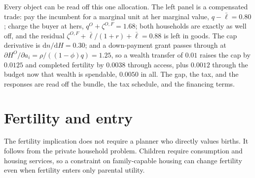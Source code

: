 \documentclass[11pt]{article}
\newcommand{\dd}{\mathrm d}
\newcommand{\1}{\mathbf 1}
\begin{document}
Every object can be read off this one allocation. The left panel is a compensated trade: pay the incumbent for a marginal unit at her marginal value, $q-\bar\ell=0.80$; charge the buyer at hers, $q^O+\zeta^{O,F}=1.68$; both households are exactly as well off, and the residual $\zeta^{O,F}+\bar\ell/(1+r)+\bar\ell=0.88$ is left in goods. The cap derivative is $\dd n/\dd H=0.30$; and a down-payment grant passes through at $\partial H^O/\partial a_i=\rho/((1-\phi)q)=1.25$, so a wealth transfer of $0.01$ raises the cap by $0.0125$ and completed fertility by $0.0038$ through access, plus $0.0012$ through the budget now that wealth is spendable, $0.0050$ in all. The gap, the tax, and the responses are read off the bundle, the tax schedule, and the financing terms.

\section{Fertility and entry}

The fertility implication does not require a planner who directly values births. It follows from the private household problem. Children require consumption and housing services, so a constraint on family-capable housing can change fertility even when fertility enters only parental utility.
\end{document}
